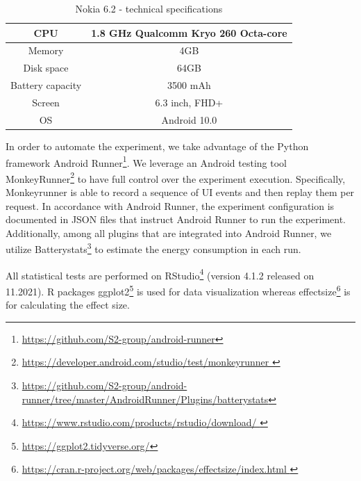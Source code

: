 \begin{table}[t]
\centering
\caption{Nokia 6.2 - technical specifications}
\label{table1}
\begin{tabular}{|c|c|}
\hline
CPU & 1.8 GHz Qualcomm Kryo 260 Octa-core\\
\hline

Memory & 4GB \\ 
\hline

Disk space &  64GB \\
\hline

Battery capacity &  3500 mAh \\
\hline

Screen &  6.3 inch, FHD+ \\
\hline

OS & Android 10.0 \\
\hline

\end{tabular}
\label{table_MAP}
\end{table}


In order to automate the experiment, we take advantage of the Python framework Android Runner\footnote{\label{note1}\href{ https://github.com/S2-group/android-runner }{https://github.com/S2-group/android-runner}}. We leverage an Android testing tool MonkeyRunner\footnote{\label{note1}\href{ https://developer.android.com/studio/test/monkeyrunner  }{https://developer.android.com/studio/test/monkeyrunner }} to have full control over the experiment execution. Specifically, Monkeyrunner is able to record a sequence of UI events and then replay them per request. In accordance with Android Runner, the experiment configuration is documented in JSON files that instruct Android Runner to run the experiment. Additionally, among all plugins that are integrated into Android Runner, we utilize Batterystats\footnote{\label{note1}\href{ https://github.com/S2-group/android-runner/tree/master/AndroidRunner/Plugins/batterystats}{\url{https://github.com/S2-group/android-runner/tree/master/AndroidRunner/Plugins/batterystats}}} to estimate the energy consumption in each run. 

All statistical tests are performed on RStudio\footnote{\label{note1}\href{ https://www.rstudio.com/products/rstudio/download/    }{https://www.rstudio.com/products/rstudio/download/ }} (version 4.1.2 released on 11.2021). R packages ggplot2\footnote{\label{note1}\href{ https://ggplot2.tidyverse.org/   }{https://ggplot2.tidyverse.org/}} is used for data visualization whereas effectsize\footnote{\label{note1}\href{  https://cran.r-project.org/web/packages/effectsize/index.html    }{ https://cran.r-project.org/web/packages/effectsize/index.html }} is for calculating the effect size. 


